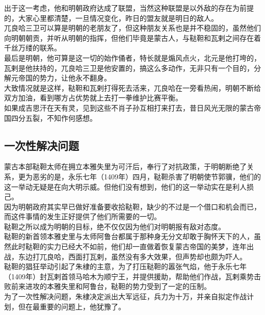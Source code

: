 \begin{multicols}{\theparacolNo}
出于这一考虑，他和明朝政府达成了联盟，当然这种联盟是以外敌的存在为前提的，大家心里都清楚，一旦情况变化，昨日的盟友就是明日的敌人。\\

兀良哈三卫可以算是明朝的老朋友了，但这种朋友关系也是并不稳固的，虽然他们向明朝朝贡，并听从明朝的指挥，但他们毕竟是蒙古人，与鞑靼和瓦剌之间存在着千丝万缕的联系。\\

最后是明朝，他可算是这一切的始作俑者，特长就是煽风点火，北元是他打垮的，瓦剌是他扶持的，兀良哈三卫是他安置的，搞这么多动作，无非只有一个目的，分解元帝国的势力，让他永不翻身。\\

大致情况就是这样，鞑靼和瓦剌打得死去活来，兀良哈在一旁看热闹，明朝不断给双方加油，看到哪方占优势就上去打一拳维护比赛平衡。\\

如果成吉思汗在天有灵，见到这些不肖子孙互相打来打去，昔日风光无限的蒙古帝国四分五裂，不知作何感想。\\

\subsection{一次性解决问题}
蒙古本部鞑靼太师在拥立本雅失里为可汗后，奉行了对抗政策，于明朝断绝了关系，更为恶劣的是，永乐七年（1409年）四月，鞑靼杀害了明朝使节郭骥，他们的这一举动无疑是在向大明示威。但他们没有想到，他们的这一举动实在是利人损己。\\

因为明朝政府其实早已做好准备要收拾鞑靼，缺少的不过是一个借口和机会而已，而这件事情的发生正好提供了他们所需要的一切。\\

鞑靼之所以成为明朝的目标，绝不仅仅因为他们对明朝报有敌对态度。\\

鞑靼的新首领本雅史里与太师阿鲁台都属于那种身无分文却敢于胸怀天下的人，虽然此时鞑靼的实力已经大不如前，他们却一直做着恢复蒙古帝国的美梦，连年出战，东边打兀良哈，西面打瓦剌，虽然没有多大效果，但声势却也颇为吓人。\\

鞑靼的猖狂举动引起了朱棣的主意，为了打压鞑靼的嚣张气焰，他于永乐七年（1409年）封瓦剌首领马哈木为顺宁王，并提供援助，帮助他们作战，瓦剌乘势击败前来进攻的本雅失里和阿鲁台，鞑靼的势力受到了一定的压制。\\

为了一次性解决问题，朱棣决定派出大军远征，兵力为十万，并亲自拟定作战计划，但在最重要的问题上，他犹豫了。\\


\end{multicols}
